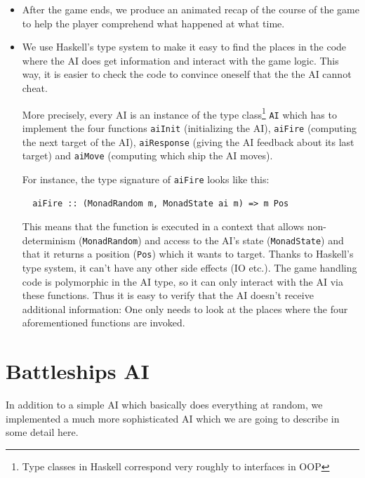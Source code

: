 \documentclass[a4paper]{easychair}
\begin{document}
\begin{itemize}
 \item After the game ends, we produce an animated recap of the course of the game to help the player comprehend what happened at what time. 
 \item We use Haskell's type system to make it easy to find the places in the code where the AI does get information and interact with the game logic. This way, it is easier to check the code to convince oneself that the the AI cannot cheat.
 

 More precisely, every AI is an instance of the type class\footnote{Type classes in Haskell correspond very roughly to interfaces in OOP} \verb+AI+ which has to implement the four functions \verb+aiInit+ (initializing the AI), \verb+aiFire+ (computing the next target of the AI), \verb+aiResponse+ (giving the AI feedback about its last target) and \verb+aiMove+ (computing which ship the AI moves).
 
 For instance, the type signature of \verb+aiFire+ looks like this:
 \begin{verbatim}
  aiFire :: (MonadRandom m, MonadState ai m) => m Pos
 \end{verbatim}
 This means that the function is executed in a context that allows non-determinism (\verb|MonadRandom|) and access to the AI's state (\verb|MonadState|) and that it returns a position (\verb|Pos|) which it wants to target. Thanks to Haskell's type system, it can't have any other side effects (IO etc.). The game handling code is polymorphic in the AI type, so it can only interact with the AI via these functions. Thus it is easy to verify that the AI doesn't receive additional information: One only needs to look at the places where the four aforementioned functions are invoked.

\end{itemize}

\section{Battleships AI}
\label{sect:battleships-ai}
In addition to a simple AI which basically does everything at random, we implemented a much more sophisticated AI which we are going to describe in some detail here.
\end{document}
